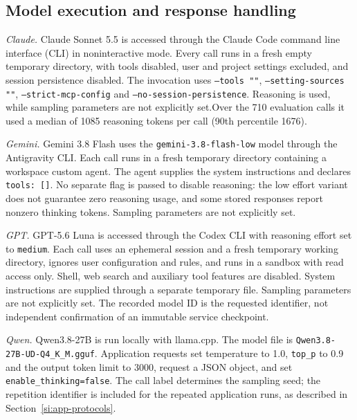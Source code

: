 \clearpage
\subsection{Model execution and response handling}
\label{si:model-execution}

\textit{Claude.} Claude Sonnet 5.5 is accessed through the Claude Code command line interface (CLI) in noninteractive mode.\cite{anthropic2026sonnet55,anthropic2026claudecode} Every call runs in a fresh empty temporary directory, with tools disabled, user and project settings excluded, and session persistence disabled. The invocation uses \texttt{--tools ""}, \texttt{--setting-sources ""}, \texttt{--strict-mcp-config} and \texttt{--no-session-persistence}. Reasoning is used, while sampling parameters are not explicitly set.\ifbulk Over the 710 evaluation calls it used a median of 1085 reasoning tokens per call (90th percentile 1676).\fi{}

\textit{Gemini.} Gemini 3.8 Flash uses the \texttt{gemini-3.8-flash-low} model through the Antigravity CLI.\cite{google2026gemini38flash} Each call runs in a fresh temporary directory containing a workspace custom agent. The agent supplies the system instructions and declares \texttt{tools: []}. No separate flag is passed to disable reasoning: the low effort variant does not guarantee zero reasoning usage, and some stored responses report nonzero thinking tokens. Sampling parameters are not explicitly set.

\textit{GPT.} GPT-5.6 Luna is accessed through the Codex CLI with reasoning effort set to \texttt{medium}. Each call uses an ephemeral session and a fresh temporary working directory, ignores user configuration and rules, and runs in a sandbox with read access only. Shell, web search and auxiliary tool features are disabled. System instructions are supplied through a separate temporary file. Sampling parameters are not explicitly set. The recorded model ID is the requested identifier, not independent confirmation of an immutable service checkpoint.

\textit{Qwen.} Qwen3.8-27B is run locally with llama.cpp.\cite{qwen38,llamacpp} The model file is \texttt{Qwen3.8-\allowbreak 27B-UD-\allowbreak Q4\_K\_M.gguf}. Application requests set temperature to 1.0, \texttt{top\_p} to 0.9 and the output token limit to 3000, request a JSON object, and set \texttt{enable\_thinking=false}. The call label determines the sampling seed; the repetition identifier is included for the repeated application runs, as described in Section~\ref{si:app-protocols}.

